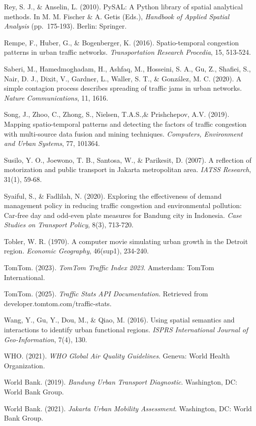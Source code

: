 \documentclass[12pt,a4paper]{article}
\begin{document}
Rey, S. J., \& Anselin, L. (2010). PySAL: A Python library of spatial analytical methods. In M. M. Fischer \& A. Getis (Eds.), \emph{Handbook of Applied Spatial Analysis} (pp.~175-193). Berlin: Springer.

Rempe, F., Huber, G., \& Bogenberger, K. (2016). Spatio-temporal congestion patterns in urban traffic networks. \emph{Transportation Research Procedia}, 15, 513-524.

Saberi, M., Hamedmoghadam, H., Ashfaq, M., Hosseini, S. A., Gu, Z., Shafiei, S., Nair, D. J., Dixit, V., Gardner, L., Waller, S. T., \& Gonz\'{a}lez, M. C. (2020). A simple contagion process describes spreading of traffic jams in urban networks. \emph{Nature Communications}, 11, 1616.

Song, J.,  Zhoo, C., Zhong, S., Nielsen,  T.A.S.,\& Prishchepov, A.V. (2019). Mapping spatio-temporal patterns and detecting the factors of traffic congestion with multi-source data fusion and mining techniques. \emph{Computers, Environment and Urban Systems}, 77, 101364.

Susilo, Y. O., Joewono, T. B., Santosa, W., \& Parikesit, D. (2007). A reflection of motorization and public transport in Jakarta metropolitan area. \emph{IATSS Research}, 31(1), 59-68.

Syaiful, S., \& Fadlilah, N. (2020). Exploring the effectiveness of demand management policy in reducing traffic congestion and environmental pollution: Car-free day and odd-even plate measures for Bandung city in Indonesia. \emph{Case Studies on Transport Policy}, 8(3), 713-720.

Tobler, W. R. (1970). A computer movie simulating urban growth in the Detroit region. \emph{Economic Geography}, 46(sup1), 234-240.

TomTom. (2023). \emph{TomTom Traffic Index 2023}. Amsterdam: TomTom International.

TomTom. (2025). \emph{Traffic Stats API Documentation}. Retrieved from developer.tomtom.com/traffic-stats.

Wang, Y., Gu, Y., Dou, M., \& Qiao, M. (2016). Using spatial semantics and interactions to identify urban functional regions. \emph{ISPRS International Journal of Geo-Information}, 7(4), 130.


WHO. (2021). \emph{WHO Global Air Quality Guidelines}. Geneva: World Health Organization.

World Bank. (2019). \emph{Bandung Urban Transport Diagnostic}. Washington, DC: World Bank Group.

World Bank. (2021). \emph{Jakarta Urban Mobility Assessment}. Washington, DC: World Bank Group.
\end{document}
